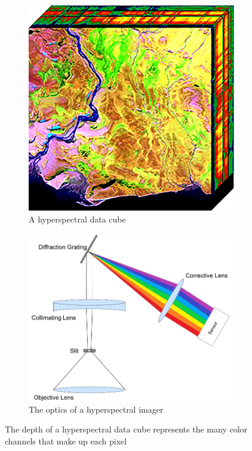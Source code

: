\documentclass{article}
\begin{document}
\begin{figure}[ht]
\centering
\begin{subfigure}[b]{0.37\textwidth}
    \centering
    \includegraphics[width=\textwidth]{datacube.png}
    \caption{A hyperspectral data cube \cite{hsi-cube}}
    \label{fig:image1}
\end{subfigure}
\hfill
\begin{subfigure}[b]{0.53\textwidth}
    \centering
    \includegraphics[width=\textwidth]{hsi_optics.png}
    \caption{The optics of a hyperspectral imager \cite{nat-presentation}}
    \label{fig:image2}
\end{subfigure}
\caption{The depth of a hyperspectral data cube represents the many color channels that make up each pixel}
\label{fig:hsi}
\end{figure}
\end{document}
